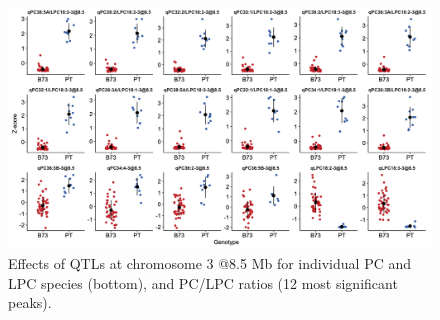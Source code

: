 \documentclass[9pt,twocolumn,twoside,lineno]{biorxiv}
\begin{document}
\clearpage

\begin{figure}[t]
\begin{center}
\includegraphics[width=0.9\paperwidth]{Sup_Figures/Sup_Fig_2.png}
\caption{Effects of QTLs at chromosome 3 @8.5 Mb for individual PC and LPC species (bottom), and PC/LPC ratios (12 most significant peaks).
}

\label{SupFig2}
\end{center}
\end{figure} 

\clearpage
\end{document}
